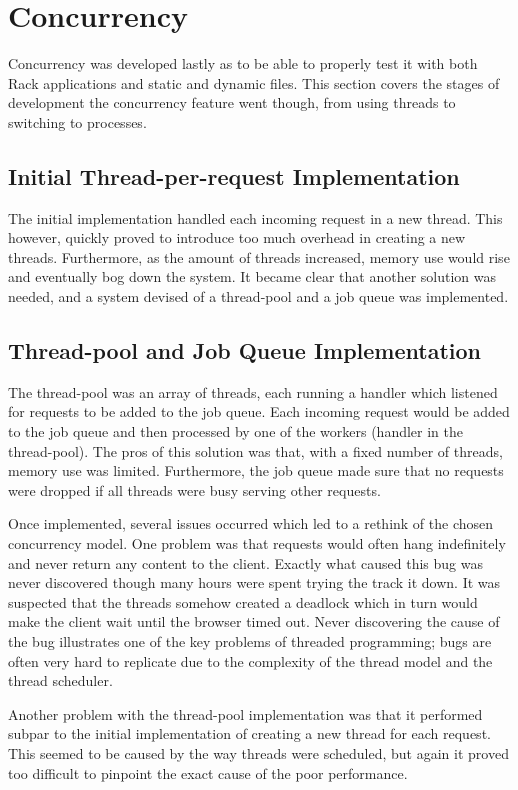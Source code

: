 \section{Concurrency}
Concurrency was developed lastly as to be able to properly test it with both
Rack applications and static and dynamic files. This section covers the stages
of development the concurrency feature went though, from using threads to
switching to processes.

\subsection{Initial Thread-per-request Implementation}
The initial implementation handled each incoming request in a new thread. This
however, quickly proved to introduce too much overhead in creating a new
threads. Furthermore, as the amount of threads increased, memory use would
rise and eventually bog down the system. It became clear that another
solution was needed, and a system devised of a thread-pool and a job queue was
implemented. 

\subsection{Thread-pool and Job Queue Implementation}
The thread-pool was an array of threads, each running a handler which listened
for requests to be added to the job queue. Each incoming request would be added to
the job queue and then processed by one of the workers (handler in the
    thread-pool). The pros of this
solution was that, with a fixed number of threads, memory use was limited.
Furthermore, the job queue made sure that no requests were dropped if all
threads were busy serving other requests. 

Once implemented, several issues occurred which led to a rethink of the chosen
concurrency model. One problem was that requests would often hang indefinitely
and never return any content to the client. Exactly what caused this bug was
never discovered though many hours were spent trying the track it down. It was
suspected that the threads somehow created a deadlock which in turn would make
the client wait until the browser timed out.  Never discovering the cause of
the bug illustrates one of the key problems of threaded programming; bugs are
often very hard to replicate due to the complexity of the thread model and the
thread scheduler. 

Another problem with the thread-pool implementation was that it performed subpar to the initial implementation of creating a new thread for each request.
This seemed to be caused by the way threads were scheduled, but again it
proved too difficult to pinpoint the exact cause of the poor performance.

